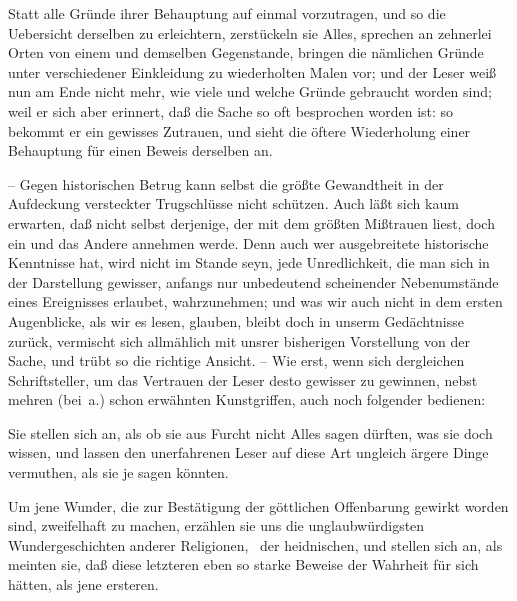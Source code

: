 \begin{aufza}
\begin{aufzb}
\begin{aufzc}
\item Statt alle Gründe ihrer Behauptung auf einmal vorzutragen, und so die Uebersicht derselben zu erleichtern, zerstückeln sie Alles, sprechen an zehnerlei Orten von einem und demselben Gegenstande, bringen die nämlichen Gründe unter verschiedener Einkleidung zu wiederholten Malen vor; und der Leser weiß nun am Ende nicht mehr, wie viele und welche Gründe gebraucht worden sind; weil er sich aber erinnert, daß die Sache so oft besprochen worden ist: so bekommt er ein gewisses Zutrauen, und sieht die öftere Wiederholung einer Behauptung für einen Beweis derselben an.
\end{aufzc}
\item {} -- Gegen historischen Betrug kann selbst die größte Gewandtheit in der Aufdeckung versteckter Trugschlüsse nicht schützen. Auch läßt sich kaum erwarten, daß nicht selbst derjenige, der mit dem größten Mißtrauen liest, doch ein und das Andere annehmen werde. Denn auch wer ausgebreitete historische Kenntnisse hat, wird nicht im Stande seyn, jede Unredlichkeit, die man sich in der Darstellung gewisser, anfangs nur unbedeutend scheinender Nebenumstände eines Ereignisses erlaubet, wahrzunehmen; und was wir auch nicht in dem ersten Augenblicke, als wir es lesen, glauben, bleibt doch in unserm Gedächtnisse zurück, vermischt sich allmählich mit unsrer bisherigen Vorstellung von der Sache, und trübt so die richtige Ansicht. -- Wie erst, wenn sich dergleichen Schriftsteller, um das Vertrauen der Leser desto gewisser zu gewinnen, nebst mehren (bei~a.) schon erwähnten Kunstgriffen, auch noch folgender bedienen:~
\begin{aufzc}
\item Sie stellen sich an, als ob sie aus Furcht nicht Alles sagen dürften, was sie doch wissen, und lassen den unerfahrenen Leser auf diese Art ungleich ärgere Dinge vermuthen, als sie je sagen könnten.
\item Um jene Wunder, die zur Bestätigung der göttlichen Offenbarung gewirkt worden sind, zweifelhaft zu machen, erzählen sie uns die unglaubwürdigsten Wundergeschichten anderer Religionen, \zB\ der heidnischen, und stellen sich an, als meinten sie, daß diese letzteren eben so starke Beweise der Wahrheit für sich hätten, als jene ersteren.

\end{aufzc}
\end{aufzb}
\end{aufza}
